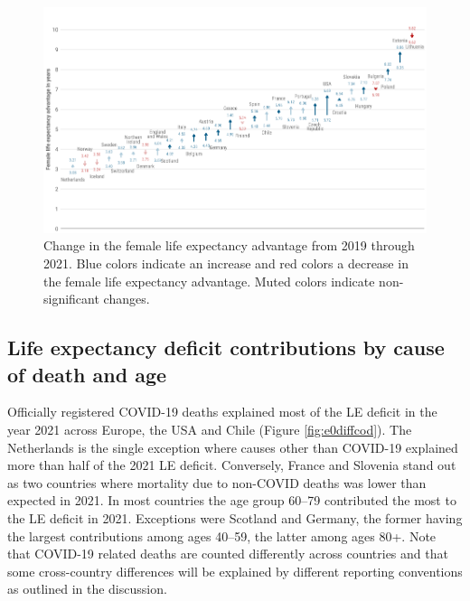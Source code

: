 \documentclass[12pt]{article}
\begin{document}
\begin{figure}[ht!]
    \centering
    \includegraphics{52-sexdiff.pdf}
    \caption{Change in the female life expectancy advantage from 2019 through 2021. Blue colors indicate an increase and red colors a decrease in the female life expectancy advantage. Muted colors indicate non-significant changes.}
    \label{fig:sexdiff}
\end{figure}


\subsection*{Life expectancy deficit contributions by cause of death and age}

Officially registered COVID-19 deaths explained most of the LE deficit in the year 2021 across Europe, the USA and Chile (Figure \ref{fig:e0diffcod}). The Netherlands is the single exception where causes other than COVID-19 explained more than half of the 2021 LE deficit. Conversely, France and Slovenia stand out as two countries where mortality due to non-COVID deaths was lower than expected in 2021. In most countries the age group 60--79 contributed the most to the LE deficit in 2021. Exceptions were Scotland and Germany, the former having the largest contributions among ages 40--59, the latter among ages 80+. Note that COVID-19 related deaths are counted differently across countries and that some cross-country differences will be explained by different reporting conventions as outlined in the discussion.
\end{document}
